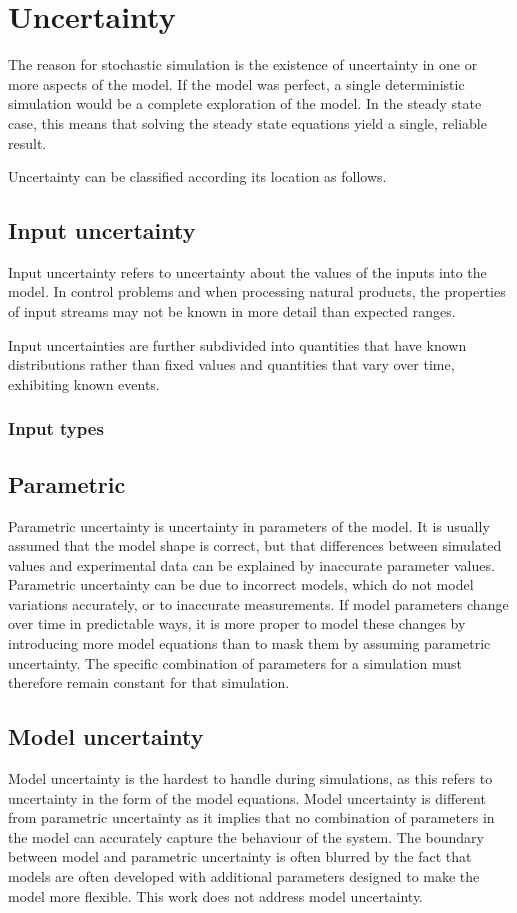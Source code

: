 \section{Uncertainty}
The reason for stochastic simulation is the existence of uncertainty in
one or more aspects of the model.  If the model was perfect, a single
deterministic simulation would be a complete exploration of the
model.  In the steady state case, this means that solving the steady
state equations yield a single, reliable result.  

Uncertainty can be classified according its location as follows.

\subsection{Input uncertainty}
Input uncertainty refers to uncertainty about the values of the inputs
into the model.  In control problems and when processing natural
products, the properties of input streams may not be known in more
detail than expected ranges.

Input uncertainties are further subdivided into quantities that have
known distributions rather than fixed values and quantities that vary
over time, exhibiting known events.

\subsubsection{Input types}

\subsection{Parametric}
Parametric uncertainty is uncertainty in parameters of the model.  It
is usually assumed that the model shape is correct, but that
differences between simulated values and experimental data can be
explained by inaccurate parameter values.  Parametric uncertainty can
be due to incorrect models, which do not model variations accurately,
or to inaccurate measurements.  If model parameters change over time
in predictable ways, it is more proper to model these changes by
introducing more model equations than to mask them by assuming
parametric uncertainty.  The specific combination of parameters for a
simulation must therefore remain constant for that simulation.

\subsection{Model uncertainty}
Model uncertainty is the hardest to handle during simulations, as this
refers to uncertainty in the form of the model equations.  Model
uncertainty is different from parametric uncertainty as it implies
that no combination of parameters in the model can accurately capture
the behaviour of the system.  The boundary between model and
parametric uncertainty is often blurred by the fact that models are
often developed with additional parameters designed to make the model
more flexible.  This work does not address model uncertainty.

